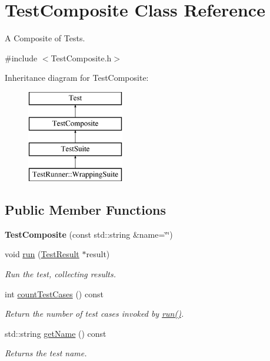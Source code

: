 \hypertarget{class_test_composite}{\section{Test\-Composite Class Reference}
\label{class_test_composite}
}


A Composite of Tests.  




{\ttfamily \#include $<$Test\-Composite.\-h$>$}

Inheritance diagram for Test\-Composite\-:\begin{figure}[H]
\begin{center}
\leavevmode
\includegraphics[height=4.000000cm]{class_test_composite}
\end{center}
\end{figure}
\subsection*{Public Member Functions}
\begin{DoxyCompactItemize}
\item 
\hypertarget{class_test_composite_aa82b05d6ca806b023beba504ec9b1d41}{{\bfseries Test\-Composite} (const std\-::string \&name=\char`\"{}\char`\"{})}\label{class_test_composite_aa82b05d6ca806b023beba504ec9b1d41}

\item 
\hypertarget{class_test_composite_a2ba14045b1a1e83963dd4db746b04dfd}{void \hyperlink{class_test_composite_a2ba14045b1a1e83963dd4db746b04dfd}{run} (\hyperlink{class_test_result}{Test\-Result} $\ast$result)}\label{class_test_composite_a2ba14045b1a1e83963dd4db746b04dfd}

\begin{DoxyCompactList}\small\item\em Run the test, collecting results. \end{DoxyCompactList}\item 
int \hyperlink{class_test_composite_aab3a79f9629eb6f026467e9c27b08788}{count\-Test\-Cases} () const 
\begin{DoxyCompactList}\small\item\em Return the number of test cases invoked by \hyperlink{class_test_composite_a2ba14045b1a1e83963dd4db746b04dfd}{run()}. \end{DoxyCompactList}\item 
std\-::string \hyperlink{class_test_composite_addf2aec7ab7233e433cb5bdf98defb61}{get\-Name} () const 
\begin{DoxyCompactList}\small\item\em Returns the test name. \end{DoxyCompactList}\end{DoxyCompactItemize}
